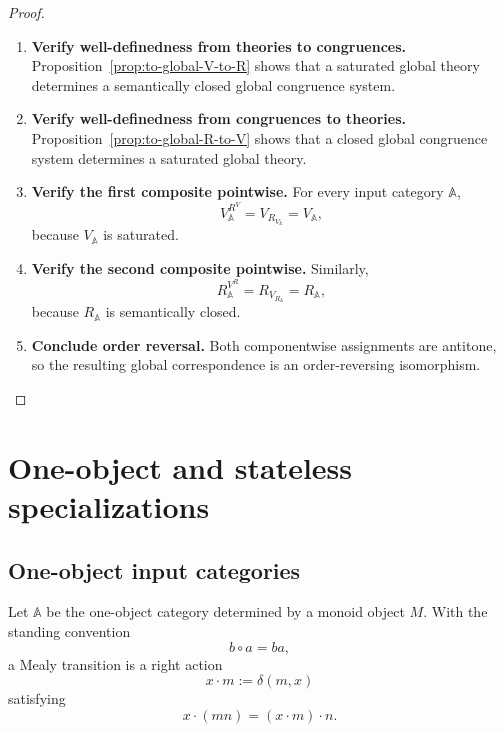 \begin{proof}
    \leavevmode
    \begin{enumerate}
        \item \textbf{Verify well-definedness from theories to congruences.}
        Proposition~\ref{prop:to-global-V-to-R} shows that a saturated global
        theory determines a semantically closed global congruence system.

        \item \textbf{Verify well-definedness from congruences to theories.}
        Proposition~\ref{prop:to-global-R-to-V} shows that a closed global
        congruence system determines a saturated global theory.

        \item \textbf{Verify the first composite pointwise.}
        For every input category \(\mathbb A\),
        \[
            V^{R^V}_{\mathbb A}
            =
            V_{R_{V_{\mathbb A}}}
            =
            V_{\mathbb A},
        \]
        because \(V_{\mathbb A}\) is saturated.

        \item \textbf{Verify the second composite pointwise.}
        Similarly,
        \[
            R^{V^R}_{\mathbb A}
            =
            R_{V_{R_{\mathbb A}}}
            =
            R_{\mathbb A},
        \]
        because \(R_{\mathbb A}\) is semantically closed.

        \item \textbf{Conclude order reversal.}
        Both componentwise assignments are antitone, so the resulting global
        correspondence is an order-reversing isomorphism.
    \end{enumerate}
\end{proof}

\section{One-object and stateless specializations}
\label{sec:to-one-object-stateless}

\subsection{One-object input categories}
\label{subsec:to-one-object-input}

Let \(\mathbb A\) be the one-object category determined by a monoid object
\(M\). With the standing convention
\[
    b\circ a=ba,
\]
a Mealy transition is a right action
\[
    x\cdot m:=\delta(m,x)
\]
satisfying
\[
    x\cdot(mn)
    =
    (x\cdot m)\cdot n.
\]

